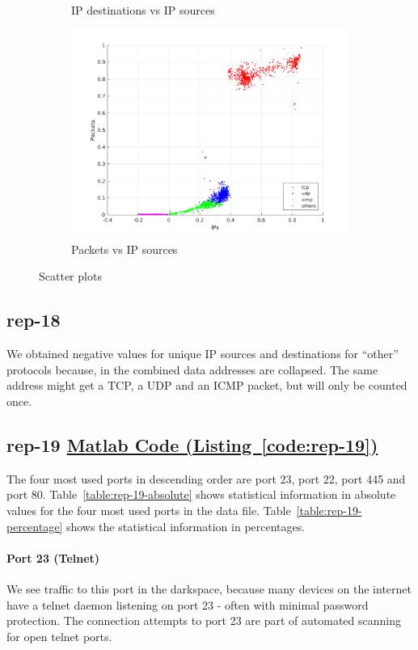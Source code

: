 \documentclass{article}
\newcommand{\codelink}[1]{%
    \hyperref[#1]{\quad\faArrowCircleRight\enskip Matlab Code (Listing~\ref{#1})}%
}
\begin{document}
\begin{figure}[h]
\begin{subfigure}{.5\textwidth}
        \caption{IP destinations vs IP sources}
    \end{subfigure}
    \begin{subfigure}{.5\textwidth}
        \centering
        \includegraphics[width=\textwidth]{../exercise-3/plots/rep_17_optional_IPsPackets.png}
        \caption{Packets vs IP sources}
    \end{subfigure}
    \caption{\label{figure:rep-17-optional} Scatter plots}
\end{figure}

\subsection{rep-18}

We obtained negative values for unique IP sources and destinations for ``other'' protocols because, in
the combined data addresses are collapsed. The same address might get a TCP, a UDP and an ICMP packet, but
will only be counted once.

\subsection{rep-19 \codelink{code:rep-19}}

The four most used ports in descending order are port 23, port 22, port 445 and port 80.
Table~\ref{table:rep-19-absolute} shows statistical information in absolute values for the
four most used ports in the data file. Table~\ref{table:rep-19-percentage} shows the statistical
information in percentages.

\paragraph{Port 23 (Telnet)}
We see traffic to this port in the darkspace, because many devices on the internet have a
telnet daemon listening on port 23 - often with minimal password protection. The connection
attempts to port 23 are part of automated scanning for open telnet ports.
\end{document}
